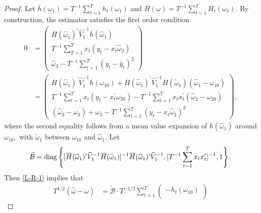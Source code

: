 \documentclass[11pt, letterpaper, twoside]{article}
\begin{document}
\begin{appendices}
\begin{proof}
Let $\overline{h}(\omega _{1})=T^{-1}\sum_{t=1}^{T}h_{t}(\omega _{1})$ and $ \overline{H}(\omega )=T^{-1}\sum_{t=1}^{T}H_{t}(\omega _{1}).$ By construction, the estimator satisfies the first order condition
%
\begin{align}
    0 &= 
    \begin{pmatrix} 
        \overline{H}(\widehat{\omega }_{1})^{\prime }\widehat{V}_{1}^{-1}\overline{h} (\widehat{\omega }_{1}) \\ 
%
        T^{-1}\sum_{T=1}^{T}x_{t}(y_{t}-x_{t}^{\prime }\widehat{\omega }_{2}) \\ 
%
        \widehat{\omega }_{3}-T^{-1}\sum_{t=1}^{T}\left( y_{t}-\widehat{y} _{t}\right) ^{2} 
    \end{pmatrix} \nonumber \\ 
%
    &= 
%
    \begin{pmatrix}
%
        \overline{H}(\widehat{\omega }_{1})^{\prime }\widehat{V}_{1}^{-1}\overline{h} (\omega _{10})+\overline{H}(\widehat{\omega }_{1})^{\prime }\widehat{V} _{1}^{-1}\overline{H}(\widetilde{\omega }_{1})(\widehat{\omega }_{1}-\omega
_{10}) \\ 
%
        T^{-1}\sum_{t=1}^{T}x_{t}(y_{t}-x_{t}^{\prime }\omega _{20})-T^{-1}\sum_{t=1}^{T}x_{t}x_{t}^{\prime }\left( \widehat{\omega } _{2}-\omega _{20}\right) \\ 
%
        \left( \widehat{\omega }_{3}-\omega _{3}\right) +\omega _{3}-T^{-1}\sum_{t=1}^{T}\left( y_{t}-x_{t}\widehat{\omega }_{2}\right) ^{2}
    \end{pmatrix},
%
  \label{L-R-1}
\end{align}
%
where the second equality follows from a mean value expansion of $\overline{h }(\widehat{\omega }_{1})$ around $\omega _{10},$ with $\widetilde{\omega } _{1}$ between $\omega _{10}$ and $\widehat{\omega }_{1}$. 
Let
%
\begin{equation}
%
    \widetilde{\mathcal{B}} = \diag\left\lbrace[\overline{H}(\widehat{\omega }_{1})^{\prime } \widehat{V}_{1}^{-1}\overline{H}(\widetilde{\omega }_{1})]^{-1}\overline{H}( \widehat{\omega }_{1})^{\prime }\widehat{V}_{1}^{-1},[T^{-1} \sum_{t=1}^{T}x_{t}x_{t}^{\prime }]^{-1},1\right\rbrace.  
%
\end{equation}
%
Then \cref{L-R-1} implies that 
%
\begin{align}
    T^{1/2}\left( \widehat{\omega }-\omega \right) 
%    
    &= \widetilde{\mathcal{B}} \cdot T^{-1/2}\sum_{t=1}^{T} 
%
    \begin{pmatrix}
        -h_{t}(\omega _{10}) \\ 

\end{pmatrix}
\end{align}
\end{proof}
\end{appendices}
\end{document}
